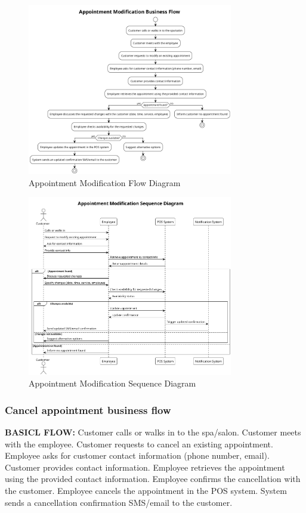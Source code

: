 \documentclass[]{VUMIFTemplateClass}
\begin{document}
\begin{figure}[H]
    \centering
    \includegraphics[width=0.8\textwidth]{images/diagrams/services/appointment_modification_flow.png}
    \caption{Appointment Modification Flow Diagram}
    \label{fig:appointment_modification_flow}
\end{figure}

\begin{figure}[H]
    \centering
    \includegraphics[width=0.8\textwidth]{images/diagrams/services/appointment_modification_sequence.png}
    \caption{Appointment Modification Sequence Diagram}
    \label{fig:appointment_modification_sequence}
\end{figure}

\subsubsection{Cancel appointment business flow}
\textbf{BASICL FLOW:}
Customer calls or walks in to the spa/salon.
Customer meets with the employee.
Customer requests to cancel an existing appointment.
Employee asks for customer contact information (phone number, email).
Customer provides contact information.
Employee retrieves the appointment using the provided contact information.
Employee confirms the cancellation with the customer.
Employee cancels the appointment in the POS system.
System sends a cancellation confirmation SMS/email to the customer.
\end{document}
